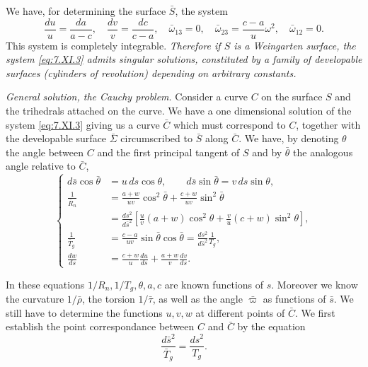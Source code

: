 \documentclass[leqno,11pt]{book}
\numberwithin{equation}{chapter}
\theoremstyle{shape1}
\theoremstyle{shape0}
\theoremstyle{shape2}
\theoremstyle{definition}
\begin{document}
We have, for determining the surface $\bar S$, the system
\begin{equation}
  \label{eq:7.XI.7}\tag{XI, 7}
  \frac{du}{u}=\frac{da}{a-c},\quad\frac{dv}{v}=\frac{dc}{c-a},\quad\bar\omega_{13}=0,\quad\bar\omega_{23}=\frac{c-a}{u}\omega^{2},\quad\bar\omega_{12}=0.
\end{equation}
This system is completely integrable. \emph{Therefore if $S$ is a Weingarten surface, the system \eqref{eq:7.XI.3} admits singular solutions, constituted by a family of developable surfaces (cylinders of revolution) depending on arbitrary constants.}

\vspace{12pt}\fsec\emph{General solution, the Cauchy problem}. Consider a curve $C$ on the surface $S$ and the trihedrals attached on the curve. We have a one dimensional solution of the system \eqref{eq:7.XI.3} giving us a curve $\bar C$ which must correspond to $C$, together with the developable surface $\bar\Sigma$ circumscribed to $\bar S$ along $\bar C$. We have, by denoting $\theta$ the angle between $C$ and the first principal tangent of $S$ and by $\bar\theta$ the analogous angle relative to $\bar C$,
\begin{equation}
  \label{eq:7.XI.8}\tag{XI, 8}
  \left\{
    \begin{aligned}
      d\bar s\cos\bar\theta&=u\,ds\cos\theta,\qquad d\bar s\sin\bar\theta=v\,ds\sin\theta,\\
      \frac{1}{\bar R_{n}}&=\frac{a+w}{uv}\cos^{2}\bar\theta+\frac{c+w}{uv}\sin^{2}\bar\theta\\
      &=\frac{ds^{2}}{d\bar s^{2}}\left[\frac{u}{v}(a+w)\cos^{2}\theta+\frac{v}{u}(c+w)\sin^{2}\theta\right],\\
      \frac{1}{\bar T_{g}}&=\frac{c-a}{uv}\sin\bar\theta\cos\bar\theta=\frac{ds^{2}}{d\bar s^{2}}\frac{1}{T_{g}},\\
      \frac{dw}{ds}&=\frac{c+w}{u}\frac{du}{ds}+\frac{a+w}{v}\frac{dv}{ds}.
    \end{aligned}
  \right.
\end{equation}

In these equations $1/R_{n},1/T_{g},\theta,a,c$ are known functions of $s$. Moreover we know the curvature $1/\bar\rho$, the torsion $1/\bar\tau$, as well as the angle $\bar\varpi$ as functions of $\bar s$. We still have to determine the functions $u,v,w$ at different points of $\bar C$. We  first establish the point correspondance between $C$ and $\bar C$ by the equation
\[
\frac{d\bar s^{2}}{\bar T_{g}}=\frac{ds^{2}}{T_{g}}.
\]
\end{document}
